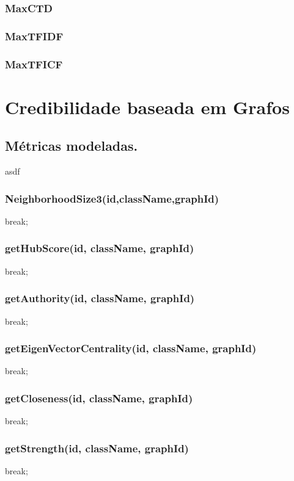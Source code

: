 \subsubsection{MaxCTD}
\label{subsubsection::maxctd}

\subsubsection{MaxTFIDF}
\label{subsubsection::maxtfidf}

\subsubsection{MaxTFICF} 
\label{subsubsection::maxtficf}

\cite{ChihHow04}

\section{Credibilidade baseada em Grafos}
\label{sec::pg_cred_baseada_grafos}

\subsection{Métricas modeladas.}
\label{subsec::pg_metricas_grafos}

asdf


\subsubsection{NeighborhoodSize3(id,className,graphId)}
break;
\subsubsection{getHubScore(id, className, graphId)}
break;
\subsubsection{getAuthority(id, className, graphId)}
break;
\subsubsection{getEigenVectorCentrality(id, className, graphId)}
break;
\subsubsection{getCloseness(id, className, graphId)}
break;
\subsubsection{getStrength(id, className, graphId)}
break;
